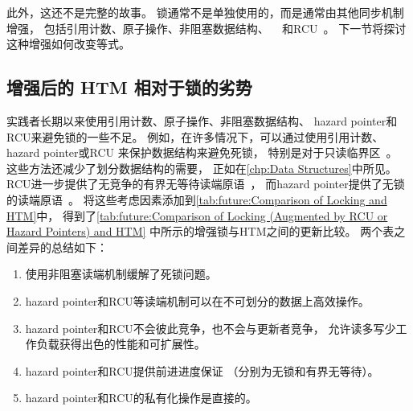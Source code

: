 此外，这还不是完整的故事。
锁通常不是单独使用的，而是通常由其他同步机制增强，
包括引用计数、原子操作、非阻塞数据结构、
~\cite{MagedMichael04a,HerlihyLM02}
和RCU~\cite{McKenney98,McKenney01a,ThomasEHart2007a,PaulEMcKenney2012ELCbattery}。
下一节将探讨这种增强如何改变等式。

\subsection{增强后的 HTM 相对于锁的劣势}
\label{sec:future:HTM Weaknesses WRT Locking When Augmented}



实践者长期以来使用引用计数、原子操作、非阻塞数据结构、
hazard pointer和RCU来避免锁的一些不足。
例如，在许多情况下，可以通过使用引用计数、hazard pointer或RCU
来保护数据结构来避免死锁，
特别是对于只读临界区~\cite{MagedMichael04a,HerlihyLM02,MathieuDesnoyers2012URCU,DinakarGuniguntala2008IBMSysJ,ThomasEHart2007a}。
这些方法还减少了划分数据结构的需要，
正如在\cref{chp:Data Structures}中所见。
RCU进一步提供了无竞争的有界无等待读端原语~\cite{McKenney98,MathieuDesnoyers2012URCU}，
而hazard pointer提供了无锁的读端原语~\cite{Michael02a,HerlihyLM02,MagedMichael04a}。
将这些考虑因素添加到\cref{tab:future:Comparison of Locking and HTM}中，
得到了\cref{tab:future:Comparison of Locking (Augmented by RCU or Hazard Pointers) and HTM}
中所示的增强锁与HTM之间的更新比较。
两个表之间差异的总结如下：

\begin{enumerate}
\item	使用非阻塞读端机制缓解了死锁问题。
\item	hazard pointer和RCU等读端机制可以在不可划分的数据上高效操作。
\item	hazard pointer和RCU不会彼此竞争，也不会与更新者竞争，
	允许读多写少工作负载获得出色的性能和可扩展性。
\item	hazard pointer和RCU提供前进进度保证
	（分别为无锁和有界无等待）。
\item	hazard pointer和RCU的私有化操作是直接的。
\end{enumerate}


\QuickQuizEnd

